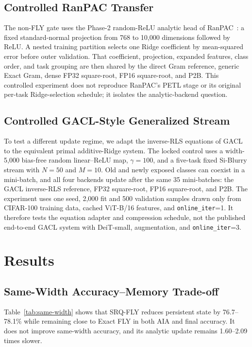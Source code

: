 \documentclass[runningheads]{llncs}
\begin{document}
\subsection{Controlled RanPAC Transfer}

The non-FLY gate uses the Phase-2 random-ReLU analytic head of
RanPAC~\cite{mcdonnell2023ranpac}: a fixed standard-normal projection from 768
to 10,000 dimensions followed by ReLU. A nested training partition selects
one Ridge coefficient by mean-squared error before outer validation. That
coefficient, projection, expanded features, class order, and task grouping are
then shared by the direct Gram reference, generic Exact Gram, dense FP32
square-root, FP16 square-root, and P2B. This controlled experiment does not
reproduce RanPAC's PETL stage or its original per-task Ridge-selection
schedule; it isolates the analytic-backend question.

\subsection{Controlled GACL-Style Generalized Stream}

To test a different update regime, we adapt the inverse-RLS equations of
GACL~\cite{zhuang2024gacl} to the equivalent primal additive-Ridge system. The
locked control uses a width-5,000 bias-free random linear--ReLU map,
$\gamma=100$, and a five-task fixed Si-Blurry stream with $N=50$ and $M=10$.
Old and newly exposed classes can coexist in a mini-batch, and all four
backends update after the same 35 mini-batches: the GACL inverse-RLS reference,
FP32 square-root, FP16 square-root, and P2B. The experiment uses one seed, 2,000
fit and 500 validation samples drawn only from CIFAR-100 training data,
cached ViT-B/16 features, and \texttt{online\_iter}=1. It therefore tests the
equation adapter and compression schedule, not the published end-to-end GACL
system with DeiT-small, augmentation, and \texttt{online\_iter}=3.

\section{Results}

\subsection{Same-Width Accuracy--Memory Trade-off}

Table~\ref{tab:same-width} shows that SRQ-FLY reduces persistent state by
76.7--78.1\% while remaining close to Exact FLY in both AIA and final accuracy.
It does not improve same-width accuracy, and its analytic update remains
1.60--2.09 times slower.
\end{document}
